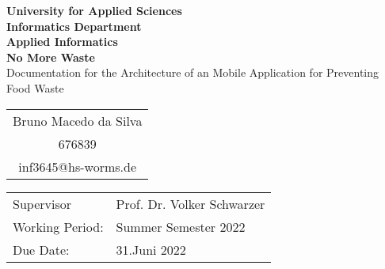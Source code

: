 \begin{titlepage}
    \vspace*{2mm}
    \begin{center}
        \Large
        \textbf{University for Applied Sciences}\\
        \textbf{Informatics Department}\\
        \textbf{Applied Informatics}\\
        \vspace{2cm}
        \textbf{No More Waste}\\
        \vspace{2cm}
        \large
        Documentation for the Architecture of an Mobile Application for Preventing Food Waste\\
        \vspace{4cm}
        \begin {table}[ht]
            \centering
            \begin{tabular}{c}
                Bruno Macedo da Silva    \\ 
                676839                   \\
                inf3645@hs-worms.de      \\
            \end{tabular}
        \end {table}
        \vspace{2cm}
        \large
        \vspace{2cm}
         \begin {table}[ht]
             \centering
             \begin{tabular}{l l}
                Supervisor         & Prof. Dr. Volker Schwarzer \\
                Working Period:    & Summer Semester 2022 \\
                Due Date:          & 31.Juni 2022 \\
             \end{tabular}
         \end {table}
    \end{center}
    \normalsize
    \vfill
 


\end{titlepage}
